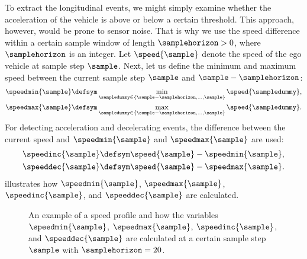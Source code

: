 \cstarta To extract the longitudinal events, we might simply examine whether the acceleration of the vehicle is above or below a certain threshold. 
This approach, however, would be prone to sensor noise. 
That is why we use the speed difference within a certain sample window of length $\samplehorizon>0$, where $\samplehorizon$ is an integer.
Let $\speed{\sample}$ denote the speed of the ego vehicle at sample step $\sample$. 
Next, let us define the minimum and maximum speed between the current sample step $\sample$ and $\sample-\samplehorizon$:
\begin{align}
	\speedmin{\sample} &\defsym \min_{\sampledummy \in \left\{ \sample-\samplehorizon, \ldots, \sample \right\} } \speed{\sampledummy}, \\
	\speedmax{\sample} &\defsym \max_{\sampledummy \in \left\{ \sample-\samplehorizon, \ldots, \sample \right\} } \speed{\sampledummy}.
\end{align}\cenda
For detecting acceleration and decelerating events, the difference between the current speed and $\speedmin{\sample}$ and $\speedmax{\sample}$ are used:
\begin{align}
	\speedinc{\sample} &\defsym \speed{\sample} - \speedmin{\sample},\\
	\speeddec{\sample} &\defsym \speed{\sample} - \speedmax{\sample}.
\end{align}
\cstartd {} illustrates how $\speedmin{\sample}$, $\speedmax{\sample}$, $\speedinc{\sample}$, and $\speeddec{\sample}$ are calculated.
\cendd

\setlength{\figurewidth}{\linewidth}
\setlength{\figureheight}{.6\linewidth}
\begin{figure}
	\centering
	
	\caption{\cstartd An example of a speed profile and how the variables $\speedmin{\sample}$, $\speedmax{\sample}$, $\speedinc{\sample}$, and $\speeddec{\sample}$ are calculated at a certain sample step $\sample$ with $\samplehorizon=20$.\cendd}
	\label{fig:explain symbols}
\end{figure}

